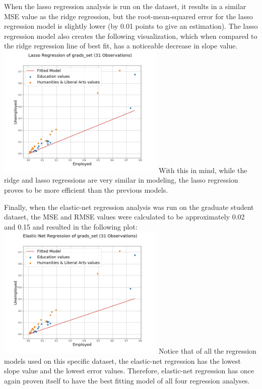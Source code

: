 \documentclass[a4paper,12pt]{IEEEtran}
\begin{document}
When the lasso regression analysis is run on the dataset, it results in a similar MSE value as the ridge regression, but the root-mean-squared error for the lasso regression model is slightly lower (by 0.01 points to give an estimation). The lasso regression model also creates the following visualization, which when compared to the ridge regression line of best fit, has a noticeable decrease in slope value. \includegraphics[width=8cm]{lasso_reg_1d_grads_set} With this in mind, while the ridge and lasso regressions are very similar in modeling, the lasso regression proves to be more efficient than the previous models.

Finally, when the elastic-net regression analysis was run on the graduate student dataset, the MSE and RMSE values were calculated to be approximately 0.02 and 0.15 and resulted in the following plot: \includegraphics[width=8cm]{en_reg_1d_grads_set} Notice that of all the regression models used on this specific dataset, the elastic-net regression has the lowest slope value and the lowest error values. Therefore, elastic-net regression has once again proven itself to have the best fitting model of all four regression analyses.
\end{document}
